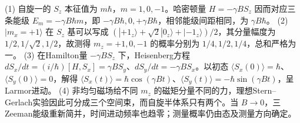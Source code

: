 (1) 自旋一的 \(S_z\) 本征值为 \(m\hbar\)，\(m=1,0,-1\)。哈密顿量 \(H=-\gamma BS_z\) 因而对应三条能级 \(E_m=-\gamma B\hbar m\)，即 \(-\gamma B\hbar,0,+\gamma B\hbar\)，相邻能级间距相同，为 \(\gamma B\hbar\)。
(2) \(|m_x=+1\rangle\) 在 \(S_z\) 基可以写成 \((|+1_z\rangle+\sqrt2|0_z\rangle+|-1_z\rangle)/2\)，其分量幅度为 \(1/2,1/\sqrt2,1/2\)，故测得 \(m_z=+1,0,-1\) 的概率分别为 \(1/4,1/2,1/4\)，总和严格为一。
(3) 在Hamilton量 \(-\gamma BS_z\) 下，Heisenberg方程 \(dS_x/dt=(i/\hbar)[H,S_x]=\gamma B S_y\)、\(dS_y/dt=-\gamma B S_x\)。以初态 \(\langle S_x(0)\rangle=\hbar\)、\(\langle S_y(0)\rangle=0\)，解得 \(\langle S_x(t)\rangle=\hbar\cos(\gamma Bt)\)、\(\langle S_y(t)\rangle=-\hbar\sin(\gamma Bt)\)，呈Larmor进动。
(4) 非均匀磁场给不同 \(m_z\) 的磁矩分量不同的力，理想Stern–Gerlach实验因此可分成三个空间束，而自旋半体系只有两个。当 \(B\to0\)，三Zeeman能级重新简并，时间进动频率也趋零；测量概率仍由态及测量方向确定。
